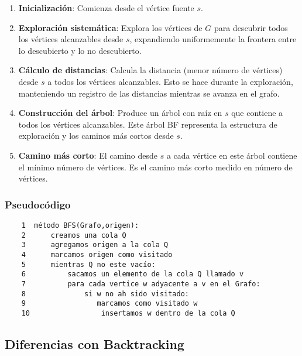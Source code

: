 \begin{enumerate}
    \item \textbf{Inicialización}: Comienza desde el vértice fuente $s$.
    \item \textbf{Exploración sistemática}: Explora los vértices de $G$ para descubrir todos los vértices alcanzables desde $s$, expandiendo uniformemente la frontera entre lo descubierto y lo no descubierto.
    \item \textbf{Cálculo de distancias}: Calcula la distancia (menor número de vértices) desde $s$ a todos los vértices alcanzables. Esto se hace durante la exploración, manteniendo un registro de las distancias mientras se avanza en el grafo.
    \item \textbf{Construcción del árbol}: Produce un árbol con raíz en $s$ que contiene a todos los vértices alcanzables. Este árbol BF representa la estructura de exploración y los caminos más cortos desde $s$.
    \item \textbf{Camino más corto}: El camino desde $s$ a cada vértice en este árbol contiene el mínimo número de vértices. Es el camino más corto medido en número de vértices.
\end{enumerate}

\subsubsection*{Pseudocódigo \cite{bfsps}}

\begin{verbatim}
    1  método BFS(Grafo,origen):
    2      creamos una cola Q
    3      agregamos origen a la cola Q
    4      marcamos origen como visitado
    5      mientras Q no este vacío:
    6          sacamos un elemento de la cola Q llamado v
    7          para cada vertice w adyacente a v en el Grafo: 
    8              si w no ah sido visitado:
    9                 marcamos como visitado w
    10                 insertamos w dentro de la cola Q
\end{verbatim}


\subsection*{Diferencias con Backtracking}



